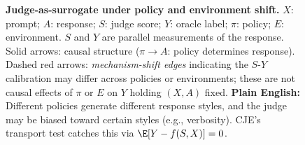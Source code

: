 \begin{figure}[t]
  \centering
  \caption{\textbf{Judge-as-surrogate under policy and environment shift.}
  $X$: prompt; $A$: response; $S$: judge score; $Y$: oracle label; $\pi$: policy; $E$: environment.
  $S$ and $Y$ are parallel measurements of the response.
  Solid arrows: causal structure ($\pi \to A$: policy determines response).
  Dashed red arrows: \emph{mechanism-shift edges} indicating the $S$-$Y$ calibration may differ across policies or environments; these are not causal effects of $\pi$ or $E$ on $Y$ holding $(X,A)$ fixed.
  \textbf{Plain English:} Different policies generate different response styles, and the judge may be biased toward certain styles (e.g., verbosity). CJE's transport test catches this via $\E[Y - f(S,X)] = 0$.}
  \label{fig:dag}
\end{figure}

